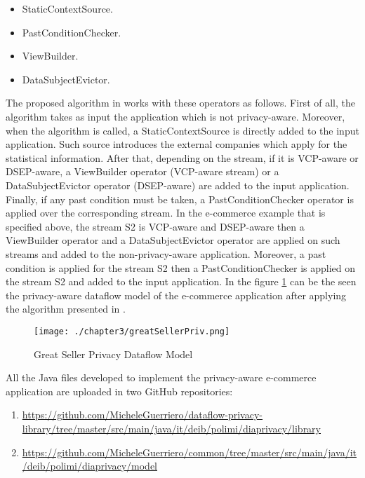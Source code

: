 \begin{itemize}
\item StaticContextSource.
\item PastConditionChecker.
\item ViewBuilder.
\item DataSubjectEvictor.
\end{itemize}

The proposed algorithm in \cite{privacypoliciesarticle} works with these operators as follows. First of all, the algorithm takes as input the application which is not privacy-aware. Moreover, when the algorithm is called, a StaticContextSource is directly added to the input application. Such source introduces the external companies which apply for the statistical information. After that, depending on the stream, if it is VCP-aware or DSEP-aware, a ViewBuilder operator (VCP-aware stream) or a DataSubjectEvictor operator (DSEP-aware) are added to the input application. Finally, if any past condition must be taken, a PastConditionChecker operator is applied over the corresponding stream. In the e-commerce example that is specified above, the stream S2 is VCP-aware and DSEP-aware then a ViewBuilder operator and a DataSubjectEvictor operator are applied on such streams and added to the non-privacy-aware application. Moreover, a past condition is applied for the stream S2 then a PastConditionChecker is applied on the stream S2 and added to the input application. In the figure \ref{fig:Great Seller Privacy Dataflow Model} can be the seen the privacy-aware dataflow model of the e-commerce application after applying the algorithm presented in \cite{privacypoliciesarticle}.

\begin{figure}
\centering
{\texttt{[image: ./chapter3/greatSellerPriv.png]}}
\caption{Great Seller Privacy Dataflow Model}
\label{fig:Great Seller Privacy Dataflow Model}
\end{figure}

All the Java files developed to implement the privacy-aware e-commerce application are uploaded in two GitHub repositories:

\begin{enumerate}
\item \url{https://github.com/MicheleGuerriero/dataflow-privacy-library/tree/master/src/main/java/it/deib/polimi/diaprivacy/library}
\item \url{https://github.com/MicheleGuerriero/common/tree/master/src/main/java/it/deib/polimi/diaprivacy/model}
\end{enumerate}

